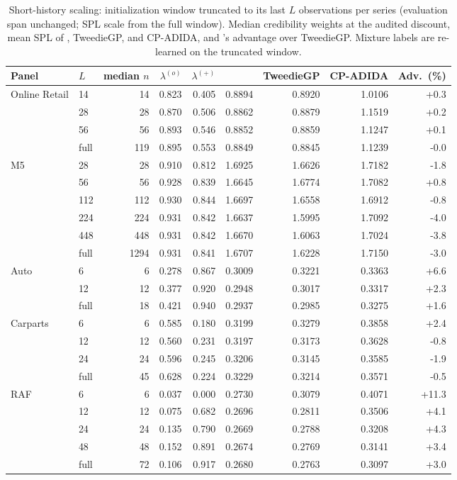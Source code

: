 \begin{table}[t]
\centering
\caption{Short-history scaling: initialization window truncated to its
last $L$ observations per series (evaluation span unchanged; SPL scale
from the full window). Median credibility weights at the audited discount,
mean SPL of \EBB{}, TweedieGP, and CP-ADIDA, and \EBB{}'s advantage over
TweedieGP. Mixture labels are re-learned on the truncated window.}
\label{tab:coldstart}
\small
\setlength{\tabcolsep}{4.5pt}
\begin{tabular}{llrrrrrrr}
\toprule
Panel & $L$ & median $n$ & $\lambda^{(o)}$ & $\lambda^{(+)}$ & \EBB{} & TweedieGP & CP-ADIDA & Adv.\ (\%)\\
\midrule
Online Retail & 14 & 14 & 0.823 & 0.405 & 0.8894 & 0.8920 & 1.0106 & +0.3\\
 & 28 & 28 & 0.870 & 0.506 & 0.8862 & 0.8879 & 1.1519 & +0.2\\
 & 56 & 56 & 0.893 & 0.546 & 0.8852 & 0.8859 & 1.1247 & +0.1\\
 & full & 119 & 0.895 & 0.553 & 0.8849 & 0.8845 & 1.1239 & -0.0\\
\addlinespace
M5 & 28 & 28 & 0.910 & 0.812 & 1.6925 & 1.6626 & 1.7182 & -1.8\\
 & 56 & 56 & 0.928 & 0.839 & 1.6645 & 1.6774 & 1.7082 & +0.8\\
 & 112 & 112 & 0.930 & 0.844 & 1.6697 & 1.6558 & 1.6912 & -0.8\\
 & 224 & 224 & 0.931 & 0.842 & 1.6637 & 1.5995 & 1.7092 & -4.0\\
 & 448 & 448 & 0.931 & 0.842 & 1.6670 & 1.6063 & 1.7024 & -3.8\\
 & full & 1294 & 0.931 & 0.841 & 1.6707 & 1.6228 & 1.7150 & -3.0\\
\addlinespace
Auto & 6 & 6 & 0.278 & 0.867 & 0.3009 & 0.3221 & 0.3363 & +6.6\\
 & 12 & 12 & 0.377 & 0.920 & 0.2948 & 0.3017 & 0.3317 & +2.3\\
 & full & 18 & 0.421 & 0.940 & 0.2937 & 0.2985 & 0.3275 & +1.6\\
\addlinespace
Carparts & 6 & 6 & 0.585 & 0.180 & 0.3199 & 0.3279 & 0.3858 & +2.4\\
 & 12 & 12 & 0.560 & 0.231 & 0.3197 & 0.3173 & 0.3628 & -0.8\\
 & 24 & 24 & 0.596 & 0.245 & 0.3206 & 0.3145 & 0.3585 & -1.9\\
 & full & 45 & 0.628 & 0.224 & 0.3229 & 0.3214 & 0.3571 & -0.5\\
\addlinespace
RAF & 6 & 6 & 0.037 & 0.000 & 0.2730 & 0.3079 & 0.4071 & +11.3\\
 & 12 & 12 & 0.075 & 0.682 & 0.2696 & 0.2811 & 0.3506 & +4.1\\
 & 24 & 24 & 0.135 & 0.790 & 0.2669 & 0.2788 & 0.3208 & +4.3\\
 & 48 & 48 & 0.152 & 0.891 & 0.2674 & 0.2769 & 0.3141 & +3.4\\
 & full & 72 & 0.106 & 0.917 & 0.2680 & 0.2763 & 0.3097 & +3.0\\
\bottomrule
\end{tabular}
\end{table}

